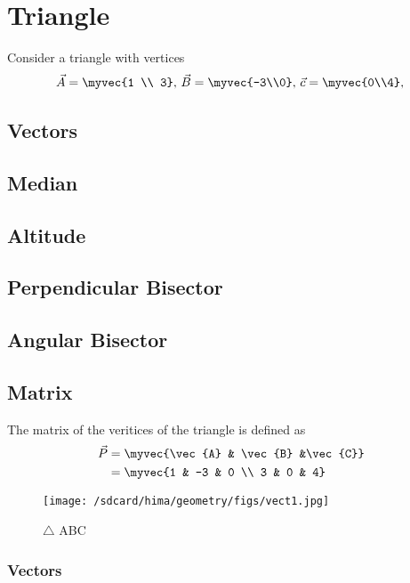 \documentclass[11pt]{book}
\begin{document}
\frontmatter
\tableofcontents
\setcounter{page}{1}
\mainmatter
\chapter{Triangle}
Consider a triangle with vertices
\begin{align}
\label{eq:tri-pts}
\vec{A}=\myvec{1 \\ 3},\,
\vec{B}=\myvec{-3\\0},\,
	\vec{c}=\myvec{0\\4},\,
\end{align}

\section{Vectors}
\section{Median}
\section{Altitude}
\section{Perpendicular Bisector}
\section{Angular Bisector}
\section{Matrix}

The matrix of the veritices of the triangle is defined as
		\begin{align}
			\vec{P} &= \myvec{\vec{A} & \vec{B} &\vec{C}} \\
            &=\myvec{1 & -3 & 0 \\ 3 & 0 & 4}
		\end{align}
\begin{figure}[H]
    \centering
    \texttt{[image: /sdcard/hima/geometry/figs/vect1.jpg]}
    \caption{$\triangle$ ABC}
    \label{fig:mat_vec1}
\end{figure}
\subsection{Vectors}
\end{document}
